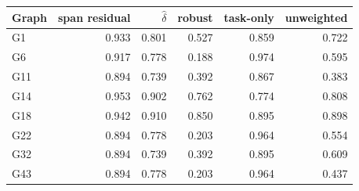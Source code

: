 \begin{tabular}{lrrrrr}\toprule
Graph & span residual & $\widehat\delta$ & robust & task-only & unweighted \\
\midrule
G1 & 0.933 & 0.801 & 0.527 & 0.859 & 0.722 \\
G6 & 0.917 & 0.778 & 0.188 & 0.974 & 0.595 \\
G11 & 0.894 & 0.739 & 0.392 & 0.867 & 0.383 \\
G14 & 0.953 & 0.902 & 0.762 & 0.774 & 0.808 \\
G18 & 0.942 & 0.910 & 0.850 & 0.895 & 0.898 \\
G22 & 0.894 & 0.778 & 0.203 & 0.964 & 0.554 \\
G32 & 0.894 & 0.739 & 0.392 & 0.895 & 0.609 \\
G43 & 0.894 & 0.778 & 0.203 & 0.964 & 0.437 \\
\bottomrule\end{tabular}
